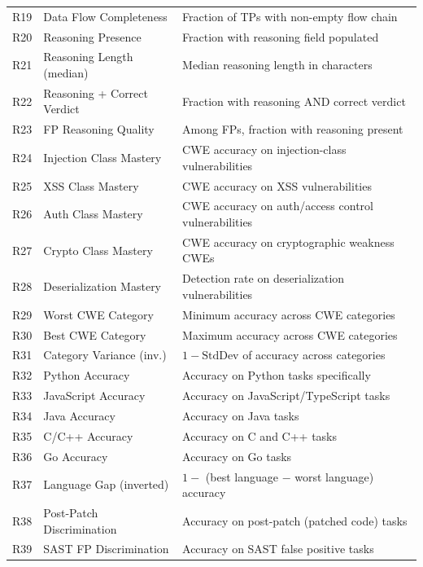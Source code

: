 \documentclass[10pt,twocolumn]{article}
\begin{document}
\begin{table}[t]
\begin{tabular}{@{}r l p{7.5cm}@{}}
R19 & Data Flow Completeness              & Fraction of TPs with non-empty flow chain \\
R20 & Reasoning Presence                  & Fraction with reasoning field populated \\
R21 & Reasoning Length (median)           & Median reasoning length in characters \\
R22 & Reasoning + Correct Verdict         & Fraction with reasoning AND correct verdict \\
R23 & FP Reasoning Quality                & Among FPs, fraction with reasoning present \\
R24 & Injection Class Mastery             & CWE accuracy on injection-class vulnerabilities \\
R25 & XSS Class Mastery                   & CWE accuracy on XSS vulnerabilities \\
R26 & Auth Class Mastery                  & CWE accuracy on auth/access control vulnerabilities \\
R27 & Crypto Class Mastery                & CWE accuracy on cryptographic weakness CWEs \\
R28 & Deserialization Mastery             & Detection rate on deserialization vulnerabilities \\
R29 & Worst CWE Category                  & Minimum accuracy across CWE categories \\
R30 & Best CWE Category                   & Maximum accuracy across CWE categories \\
R31 & Category Variance (inv.)            & $1 - \text{StdDev}$ of accuracy across categories \\
R32 & Python Accuracy                     & Accuracy on Python tasks specifically \\
R33 & JavaScript Accuracy                 & Accuracy on JavaScript/TypeScript tasks \\
R34 & Java Accuracy                       & Accuracy on Java tasks \\
R35 & C/C++ Accuracy                      & Accuracy on C and C++ tasks \\
R36 & Go Accuracy                         & Accuracy on Go tasks \\
R37 & Language Gap (inverted)             & $1 -$ (best language $-$ worst language) accuracy \\
R38 & Post-Patch Discrimination           & Accuracy on post-patch (patched code) tasks \\
R39 & SAST FP Discrimination              & Accuracy on SAST false positive tasks \\

\end{tabular}
\end{table}
\end{document}
